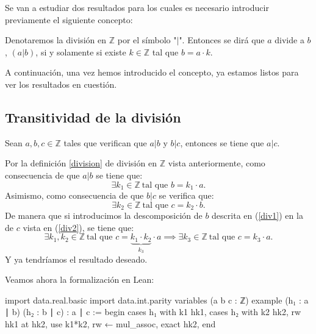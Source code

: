 Se van a estudiar dos resultados para los cuales es necesario introducir previamente el siguiente concepto:
\begin{definicion}\label{division}
	Denotaremos la división en \(\mathbb{Z}\) por el símbolo "\( | \)". Entonces se dirá que \(a\) divide a \(b\), \( (a|b)\), si y solamente si existe \(k \in \mathbb{Z}\) tal que \(b=a\cdot k\).
\end{definicion}

A continuación, una vez hemos introducido el concepto, ya estamos listos para ver los resultados en cuestión.

\subsection{Transitividad de la división}
\begin{teorema}
	Sean \(a, b, c \in \mathbb{Z}\) tales que verifican que \(a|b\) y \(b|c\), entonces se tiene que \(a|c\).
\end{teorema}
\begin{demostracion}
	Por la definición \ref{division} de división en \(\mathbb{Z}\) vista anteriormente, como consecuencia de que \(a|b\) se tiene que:
	\begin{equation}\label{div1}
	\exists k_1 \in \mathbb{Z} \ \text{tal que }b=k_1 \cdot a.
	\end{equation}
	Asimismo, como consecuencia de que \(b|c\) se verifica que:
	\begin{equation}\label{div2}
	\exists k_2 \in \mathbb{Z} \ \text{tal que }c=k_2 \cdot b.
	\end{equation}
	De manera que si introducimos la descomposición de \(b\) descrita en (\ref{div1}) en la de \(c\) vista en (\ref{div2}), se tiene que:
	\begin{equation}
	\exists k_1, k_2 \in \mathbb{Z} \ \text{tal que }c=\underbrace{k_1 \cdot k_2}_{k_3} \cdot a \implies \exists k_3\in \mathbb{Z} \ \text{tal que }c=k_3 \cdot a .
	\end{equation}
	Y ya tendríamos el resultado deseado.
\end{demostracion}

Veamos ahora la formalización en Lean:
\begin{leancode}
import data.real.basic
import data.int.parity
variables (a b c : ℤ)
example (h₁ : a ∣ b) (h₂ : b ∣ c) : a ∣ c :=
begin
cases h₁ with k1 hk1,
cases h₂ with k2 hk2,
rw hk1 at hk2,
use k1*k2,
rw ← mul_assoc,
exact hk2,
end
\end{leancode}

